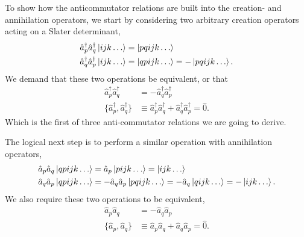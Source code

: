     To show how the anticommutator relations are built into the creation- and annihilation 
    operators, we start by considering two arbitrary creation operators acting on a Slater determinant,
    \begin{equation}
        \begin{aligned}
            \hat{a}_p^\dagger \hat{a}_q^\dagger \ket{ijk \dots} &= \ket{pqijk \dots} \\
            \hat{a}_q^\dagger \hat{a}_p^\dagger \ket{ijk \dots} &= \ket{qpijk \dots}
                = - \ket{pqijk \dots}.
        \end{aligned}
    \end{equation}
    We demand that these two operations be equivalent, or that 
    \begin{equation}
        \begin{aligned}
            \hat{a}_p^\dagger \hat{a}_q^\dagger &= 
                -\hat{a}_q^\dagger \hat{a}_p^\dagger \\
            \{\hat{a}_p^\dagger, \hat{a}_q^\dagger\} &\equiv 
                \hat{a}_p^\dagger \hat{a}_q^\dagger + 
                \hat{a}_q^\dagger \hat{a}_p^\dagger = \hat{0}.
        \end{aligned}
    \end{equation}
    Which is the first of three anti-commutator relations we are going to derive.

    The logical next step is to perform a similar operation with annihilation 
    operators,
    \begin{equation}
        \begin{aligned}
            \hat{a}_p \hat{a}_q \ket{qpijk \dots} &= 
                \hat{a}_p\ket{pijk \dots} = \ket{ijk \dots} \\
            \hat{a}_q \hat{a}_p \ket{qpijk \dots} &= 
                - \hat{a}_q \hat{a}_p \ket{pqijk \dots} = 
                - \hat{a}_q \ket{qijk \dots} = - \ket{ijk \dots}.
        \end{aligned}
    \end{equation}
    We also require these two operations to be equivalent, 
    \begin{equation}
        \begin{aligned}
            \hat{a}_p \hat{a}_q &= 
                -\hat{a}_q \hat{a}_p \\
            \{\hat{a}_p, \hat{a}_q\} &\equiv 
                \hat{a}_p \hat{a}_q + 
                \hat{a}_q \hat{a}_p = \hat{0}.
        \end{aligned}
    \end{equation}

